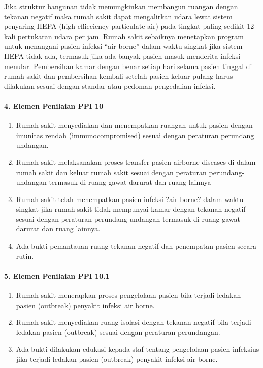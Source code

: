\documentclass[
]{book}
\providecommand{\tightlist}{%
  \setlength{\itemsep}{0pt}\setlength{\parskip}{0pt}}
\begin{document}
Jika struktur bangunan tidak memungkinkan membangun ruangan dengan tekanan negatif maka rumah sakit dapat mengalirkan udara lewat sistem penyaring HEPA (high effieciency particulate air) pada tingkat paling sedikit 12 kali pertukaran udara per jam. Rumah sakit sebaiknya menetapkan program untuk menangani pasien infeksi ``air borne'' dalam waktu singkat jika sistem HEPA tidak ada, termasuk jika ada banyak pasien masuk menderita infeksi menular. Pembersihan kamar dengan benar setiap hari selama pasien tinggal di rumah sakit dan pembersihan kembali setelah pasien keluar pulang harus dilakukan sesuai dengan standar atau pedoman pengedalian infeksi.

\hypertarget{elemen-penilaian-ppi-10}{%
\paragraph*{4. Elemen Penilaian PPI 10}\label{elemen-penilaian-ppi-10}}

\begin{enumerate}
\def\labelenumi{\alph{enumi}.}
\tightlist
\item
  Rumah sakit menyediakan dan menempatkan ruangan untuk pasien dengan imunitas rendah (immunocompromised) sesuai dengan peraturan perundang undangan.
\item
  Rumah sakit melaksanakan proses transfer pasien airborne diseases di dalam rumah sakit dan keluar rumah sakit sesuai dengan peraturan perundang- undangan termasuk di ruang gawat darurat dan ruang lainnya
\item
  Rumah sakit telah menempatkan pasien infeksi ?air borne? dalam waktu singkat jika rumah sakit tidak mempunyai kamar dengan tekanan negatif sesuai dengan peraturan perundang-undangan termasuk di ruang gawat darurat dan ruang lainnya.
\item
  Ada bukti pemantauan ruang tekanan negatif dan penempatan pasien secara rutin.
\end{enumerate}

\hypertarget{elemen-penilaian-ppi-10.1}{%
\paragraph*{5. Elemen Penilaian PPI 10.1}\label{elemen-penilaian-ppi-10.1}}

\begin{enumerate}
\def\labelenumi{\alph{enumi}.}
\tightlist
\item
  Rumah sakit menerapkan proses pengelolaan pasien bila terjadi ledakan pasien (outbreak) penyakit infeksi air borne.
\item
  Rumah sakit menyediakan ruang isolasi dengan tekanan negatif bila terjadi ledakan pasien (outbreak) sesuai dengan peraturan perundangan.
\item
  Ada bukti dilakukan edukasi kepada staf tentang pengelolaan pasien infeksius jika terjadi ledakan pasien (outbreak) penyakit infeksi air borne.
\end{enumerate}
\end{document}
